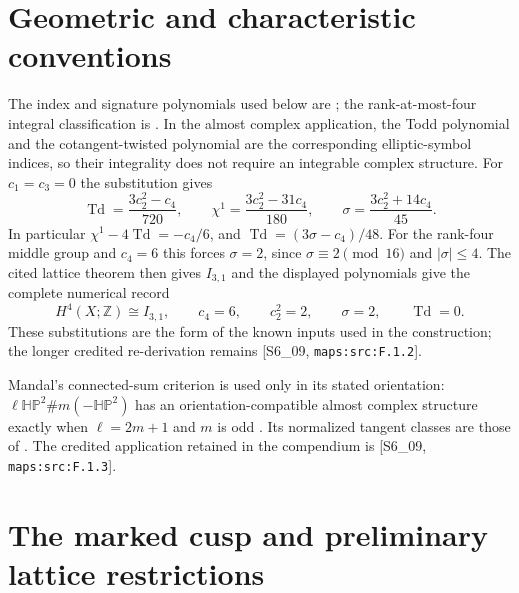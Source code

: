 \providecommand{\LL}{\mathcal L}
\providecommand{\cT}{\mathcal T}
\providecommand{\HP}{\mathbb H\mathbb P}
\providecommand{\tr}{\operatorname{tr}}
\providecommand{\sgn}{\operatorname{sgn}}
\providecommand{\vir}{\mathrm{vir}}

\section{Geometric and characteristic conventions}\label{sec:V-known-inputs}
The index and signature polynomials used below are
\cite[equations (1.2)--(1.4), pp.~3--4]{ffEsoleKang}; the
rank-at-most-four integral classification is
\cite[Theorem 2.2.1, p.~61]{ffPetersSterk}.  In the almost
complex application, the Todd polynomial and the cotangent-twisted
polynomial are the corresponding elliptic-symbol indices, so their
integrality does not require an integrable complex structure.
For $c_1=c_3=0$ the substitution gives
\begin{equation}
\operatorname{Td}=\frac{3c_2^2-c_4}{720},\qquad
\chi^1=\frac{3c_2^2-31c_4}{180},\qquad
\sigma=\frac{3c_2^2+14c_4}{45}.
\label{maps:eq:F.1}
\end{equation}
In particular $\chi^1-4\operatorname{Td}=-c_4/6$, and
$\operatorname{Td}=(3\sigma-c_4)/48$.  For the rank-four middle
group and $c_4=6$ this forces $\sigma=2$, since
$\sigma\equiv2\pmod {16}$ and $|\sigma|\leq4$.
The cited lattice theorem then gives $I_{3,1}$ and the displayed
polynomials give the complete numerical record
\begin{equation}
 H^4(X;\mathbb Z)\cong I_{3,1},\qquad c_4=6,\qquad
 c_2^2=2,\qquad\sigma=2,\qquad\operatorname{Td}=0.
 \label{maps:eq:F.2}
\end{equation}
These substitutions are the form of the known inputs used in
the construction; the longer credited re-derivation remains
[S6\_09, \nolinkurl{maps:src:F.1.2}].

Mandal's connected-sum criterion is used only in its stated
orientation: $\ell\mathbb{HP}^2\#m(-\mathbb{HP}^2)$ has an
orientation-compatible almost complex structure exactly when
$\ell=2m+1$ and $m$ is odd
\cite[Corollary 1.4, p.~4, and its proof in \S5]{ffMandal}.
Its normalized tangent classes are those of
\cite[Lemma 2.1, p.~5, and Theorem 2.4, p.~7]{ffMandal}.
The credited application retained in the compendium is
[S6\_09, \nolinkurl{maps:src:F.1.3}].


\section{The marked cusp and preliminary lattice restrictions}



